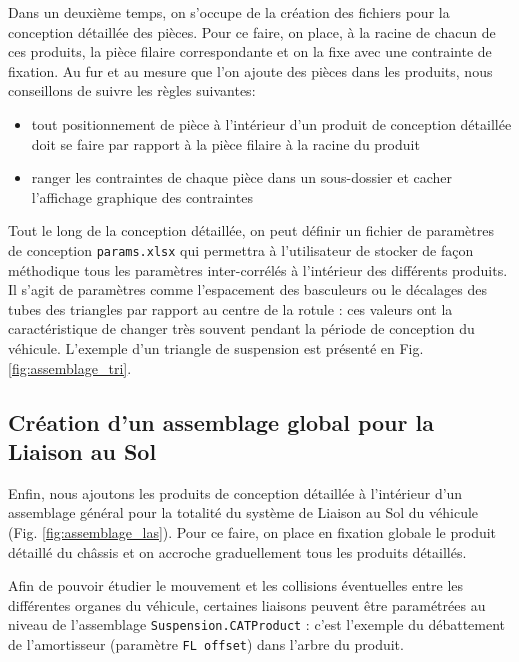 \par Dans un deuxième temps, on s'occupe de la création des fichiers pour la conception détaillée des pièces. Pour ce faire, on place, à la racine de chacun de ces produits, la pièce filaire correspondante et on la fixe avec une contrainte de fixation. Au fur et au mesure que l'on ajoute des pièces dans les produits, nous conseillons de suivre les règles suivantes:
\begin{itemize}
    \item tout positionnement de pièce à l'intérieur d'un produit de conception détaillée doit se faire par rapport à la pièce filaire à la racine du produit
    \item ranger les contraintes de chaque pièce dans un sous-dossier et cacher l'affichage graphique des contraintes 
\end{itemize}{}
\par Tout le long de la conception détaillée, on peut définir un fichier de paramètres de conception \texttt{params.xlsx} qui permettra à l'utilisateur de stocker de façon méthodique tous les paramètres inter-corrélés à l'intérieur des différents produits. Il s'agit de paramètres comme l'espacement des basculeurs ou le décalages des tubes des triangles par rapport au centre de la rotule : ces valeurs ont la caractéristique de changer très souvent pendant la période de conception du véhicule. L'exemple d'un triangle de suspension est présenté en Fig. \ref{fig:assemblage_tri}.


\subsection{Création d'un assemblage global pour la Liaison au Sol} %

\par Enfin, nous ajoutons les produits de conception détaillée à l'intérieur d'un assemblage général pour la totalité du système de Liaison au Sol du véhicule (Fig. \ref{fig:assemblage_las}). Pour ce faire, on place en fixation globale le produit détaillé du châssis et on accroche graduellement tous les produits détaillés.

\par Afin de pouvoir étudier le mouvement et les collisions éventuelles entre les différentes organes du véhicule, certaines  liaisons peuvent être paramétrées au niveau de l'assemblage \texttt{Suspension.CATProduct} : c'est l'exemple du débattement de l'amortisseur (paramètre \texttt{FL offset}) dans l'arbre du produit.

